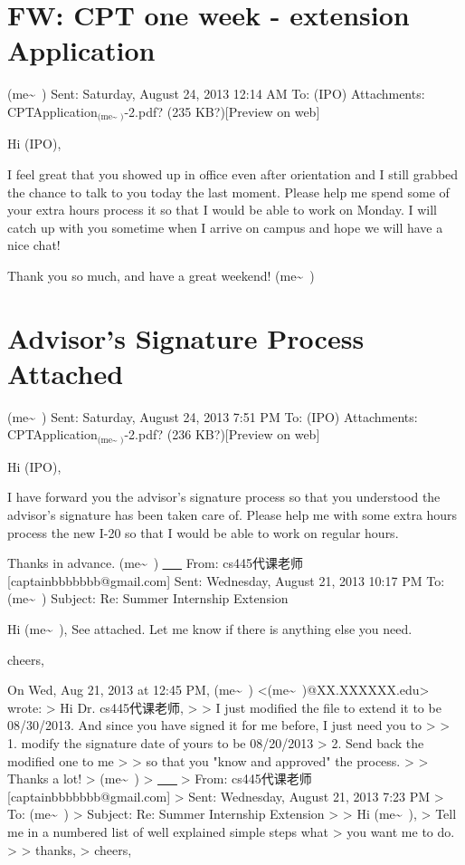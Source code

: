 \documentclass[12pt]{book}
\begin{document}
\section{FW: CPT one week - extension Application}
\label{sec-37-3}
(me\textasciitilde{}~)
Sent:        Saturday, August 24, 2013 12:14 AM
To:        
(IPO)
Attachments:        
CPTApplication$_{\text{(me\textasciitilde{}~)}}$-2.pdf? (235 KB?)[Preview on web]

Hi (IPO), 

I feel great that you showed up in office even after orientation and I still grabbed the chance to talk to you today the last moment. Please help me spend some of your extra hours process it so that I would be able to work on Monday. I will catch up with you sometime when I arrive on campus and hope we will have a nice chat!

Thank you so much, and have a great weekend!
(me\textasciitilde{}~)


\section{Advisor's Signature Process Attached}
\label{sec-37-4}
(me\textasciitilde{}~)
Sent:        Saturday, August 24, 2013 7:51 PM
To:        
(IPO)
Attachments:        
CPTApplication$_{\text{(me\textasciitilde{}~)}}$-2.pdf? (236 KB?)[Preview on web]

Hi (IPO), 

I have forward you the advisor's signature process so that you understood the advisor's signature has been taken care of. 
Please help me with some extra hours process the new I-20 so that I would be able to work on regular hours. 

Thanks in advance. 
(me\textasciitilde{}~)
\uline{\uline{\uline{\uline{\uline{\uline{\uline{\uline{\uline{\uline{\uline{\uline{\uline{\uline{\uline{\uline{\uline{\uline{\uline{\_\_}}}}}}}}}}}}}}}}}}}
From: cs445代课老师 [captainbbbbbbb@gmail.com]
Sent: Wednesday, August 21, 2013 10:17 PM
To: (me\textasciitilde{}~)
Subject: Re: Summer Internship Extension

Hi (me\textasciitilde{}~),
              See attached.   Let me know if there is anything else you need.

cheers,

On Wed, Aug 21, 2013 at 12:45 PM, (me\textasciitilde{}~)
<(me\textasciitilde{}~)@XX.XXXXXX.edu> wrote:
> Hi Dr. cs445代课老师,
>
> I just modified the file to extend it to be 08/30/2013. And since you have signed it for me before, I just need you to
>
> 1. modify the signature date of yours to be 08/20/2013
> 2. Send back the modified one to me
>
> so that you "know and approved" the process.
>
> Thanks a lot!
> (me\textasciitilde{}~)
> \uline{\uline{\uline{\uline{\uline{\uline{\uline{\uline{\uline{\uline{\uline{\uline{\uline{\uline{\uline{\uline{\uline{\uline{\uline{\_\_}}}}}}}}}}}}}}}}}}}
> From: cs445代课老师 [captainbbbbbbb@gmail.com]
> Sent: Wednesday, August 21, 2013 7:23 PM
> To: (me\textasciitilde{}~)
> Subject: Re: Summer Internship Extension
>
> Hi (me\textasciitilde{}~),
>        Tell me in a numbered list of well explained simple steps what
> you want me to do.
>
> thanks,
> cheers,
\end{document}
